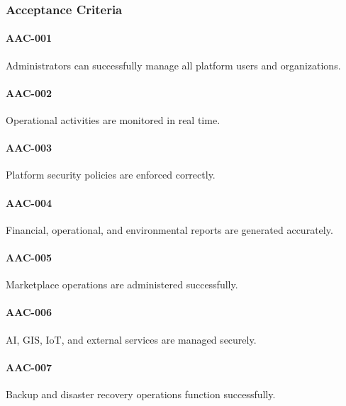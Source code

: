 
\subsubsection*{Acceptance Criteria}

\paragraph{AAC-001}

Administrators can successfully manage all platform users and
organizations.

\paragraph{AAC-002}

Operational activities are monitored in real time.

\paragraph{AAC-003}

Platform security policies are enforced correctly.

\paragraph{AAC-004}

Financial, operational, and environmental reports are generated
accurately.

\paragraph{AAC-005}

Marketplace operations are administered successfully.

\paragraph{AAC-006}

AI, GIS, IoT, and external services are managed securely.

\paragraph{AAC-007}

Backup and disaster recovery operations function successfully.

